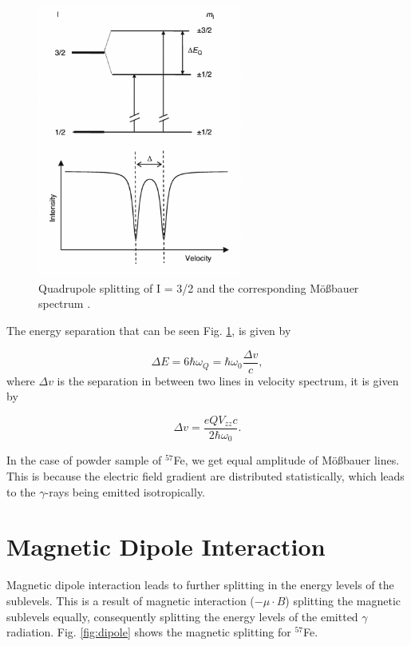 \documentclass[a4paper]{report}
\numberwithin{equation}{section}
\begin{document}
\begin{figure}[htpb]
    \centering
    \includegraphics[width=0.6\textwidth]{quadrupole}
    \caption{Quadrupole splitting of I = 3/2 and the corresponding M\"o{\ss}bauer spectrum \cite{Kuzmann2011}.}
    \label{fig:quadrupole}
\end{figure}

The energy separation that can be seen Fig. \ref{fig:quadrupole}, is given by

\begin{equation}
		\Delta E = 6 \hbar \omega _{Q} = \hbar \omega _{0} \frac{\Delta v}{c},
\end{equation}
where $\Delta v$ is the separation in between two lines in velocity spectrum, it is given by

\begin{equation}
		\Delta v = \frac{eQV_{zz}c}{2 \hbar \omega _{0}}.
\end{equation}

In the case of powder sample of $^{57}$Fe, we get equal amplitude of M\"o{\ss}bauer lines. This is because the electric field gradient are distributed statistically, which leads to the $\gamma$-rays being emitted isotropically. 

\section{Magnetic Dipole Interaction}

Magnetic dipole interaction leads to further splitting in the energy levels of the sublevels. This is a result of magnetic interaction ($- \mu \cdot B$) splitting the magnetic sublevels equally, consequently splitting the energy levels of the emitted $\gamma$ radiation. Fig. \ref{fig:dipole} shows the magnetic splitting for $^{57}$Fe. 
\end{document}
